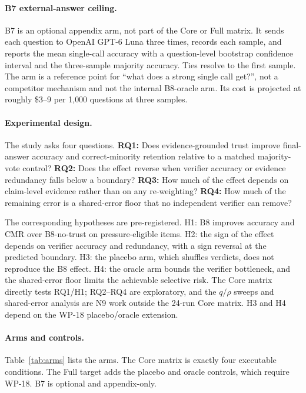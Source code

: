 \paragraph*{B7 external-answer ceiling.}
B7 is an optional appendix arm, not part of the Core or Full matrix. It sends each question to OpenAI GPT-6 Luna three times, records each sample, and reports the mean single-call accuracy with a question-level bootstrap confidence interval and the three-sample majority accuracy. Ties resolve to the first sample. The arm is a reference point for ``what does a strong single call get?'', not a competitor mechanism and not the internal B8-oracle arm. Its cost is projected at roughly \$3--9 per 1{,}000 questions at three samples.

\paragraph*{Experimental design.}
The study asks four questions. \textbf{RQ1:} Does evidence-grounded trust improve final-answer accuracy and correct-minority retention relative to a matched majority-vote control? \textbf{RQ2:} Does the effect reverse when verifier accuracy or evidence redundancy falls below a boundary? \textbf{RQ3:} How much of the effect depends on claim-level evidence rather than on any re-weighting? \textbf{RQ4:} How much of the remaining error is a shared-error floor that no independent verifier can remove?

The corresponding hypotheses are pre-registered. H1: B8 improves accuracy and CMR over B8-no-trust on pressure-eligible items. H2: the sign of the effect depends on verifier accuracy and redundancy, with a sign reversal at the predicted boundary. H3: the placebo arm, which shuffles verdicts, does not reproduce the B8 effect. H4: the oracle arm bounds the verifier bottleneck, and the shared-error floor limits the achievable selective risk. The Core matrix directly tests RQ1/H1; RQ2--RQ4 are exploratory, and the $q/\rho$ sweeps and shared-error analysis are N9 work outside the 24-run Core matrix. H3 and H4 depend on the WP-18 placebo/oracle extension.

\paragraph*{Arms and controls.}
Table~\ref{tab:arms} lists the arms. The Core matrix is exactly four executable conditions. The Full target adds the placebo and oracle controls, which require WP-18. B7 is optional and appendix-only.

